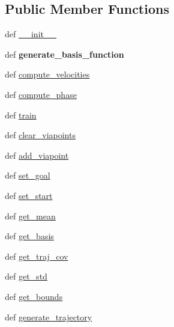 \subsection*{Public Member Functions}
\begin{DoxyCompactItemize}
\item 
def \hyperlink{classaml__lfd_1_1promp_1_1discrete__promp_1_1_discrete_p_r_o_m_p_a08411e5267252063f4ba35a92e445ddc}{\-\_\-\-\_\-init\-\_\-\-\_\-}
\item 
\hypertarget{classaml__lfd_1_1promp_1_1discrete__promp_1_1_discrete_p_r_o_m_p_a07b41a1e58a98d21e5155e8bd45e4e26}{def {\bfseries generate\-\_\-basis\-\_\-function}}\label{classaml__lfd_1_1promp_1_1discrete__promp_1_1_discrete_p_r_o_m_p_a07b41a1e58a98d21e5155e8bd45e4e26}

\item 
def \hyperlink{classaml__lfd_1_1promp_1_1discrete__promp_1_1_discrete_p_r_o_m_p_a00cdc1d700fafc8db39d2f484840f5d1}{compute\-\_\-velocities}
\item 
def \hyperlink{classaml__lfd_1_1promp_1_1discrete__promp_1_1_discrete_p_r_o_m_p_a4c1ab83285199db2e6188fbd85d11a0e}{compute\-\_\-phase}
\item 
def \hyperlink{classaml__lfd_1_1promp_1_1discrete__promp_1_1_discrete_p_r_o_m_p_a55545a68c0418bea39eee31df54ee0c7}{train}
\item 
def \hyperlink{classaml__lfd_1_1promp_1_1discrete__promp_1_1_discrete_p_r_o_m_p_a3f8d736f60febfdf772a90340a94582c}{clear\-\_\-viapoints}
\item 
def \hyperlink{classaml__lfd_1_1promp_1_1discrete__promp_1_1_discrete_p_r_o_m_p_ab41b4ebd38a88c17f04d92e075aa4e76}{add\-\_\-viapoint}
\item 
def \hyperlink{classaml__lfd_1_1promp_1_1discrete__promp_1_1_discrete_p_r_o_m_p_a4d1dffa6b93c4cea9c1e90a902b08a38}{set\-\_\-goal}
\item 
def \hyperlink{classaml__lfd_1_1promp_1_1discrete__promp_1_1_discrete_p_r_o_m_p_a7d84714c297e799717a4d92191f53f7a}{set\-\_\-start}
\item 
def \hyperlink{classaml__lfd_1_1promp_1_1discrete__promp_1_1_discrete_p_r_o_m_p_a34bb1e437a4aa0271cab9a8f3733a2a4}{get\-\_\-mean}
\item 
def \hyperlink{classaml__lfd_1_1promp_1_1discrete__promp_1_1_discrete_p_r_o_m_p_a61802fea334535438035e4a685ef29a4}{get\-\_\-basis}
\item 
def \hyperlink{classaml__lfd_1_1promp_1_1discrete__promp_1_1_discrete_p_r_o_m_p_a1a80594ca104447d509bb9a3b62c8b34}{get\-\_\-traj\-\_\-cov}
\item 
def \hyperlink{classaml__lfd_1_1promp_1_1discrete__promp_1_1_discrete_p_r_o_m_p_a76dec38525688cece31b6c6131f264f2}{get\-\_\-std}
\item 
def \hyperlink{classaml__lfd_1_1promp_1_1discrete__promp_1_1_discrete_p_r_o_m_p_ad076683586a6ccc1900180d6a481bd55}{get\-\_\-bounds}
\item 
def \hyperlink{classaml__lfd_1_1promp_1_1discrete__promp_1_1_discrete_p_r_o_m_p_a9cf60d83ce2014e1d595951f9c4e349d}{generate\-\_\-trajectory}
\end{DoxyCompactItemize}


